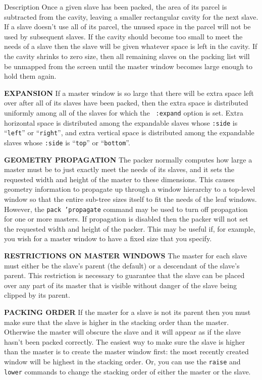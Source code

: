 \begin{schemedoc}{Description}
Once a given slave has been packed, the area of its parcel is subtracted
from the cavity, leaving a smaller rectangular cavity for the next slave.
If a slave doesn't use all of its parcel, the unused space in the parcel
will not be used by subsequent slaves.  If the cavity should become too
small to meet the needs of a slave then the slave will be given whatever
space is left in the cavity.  If the cavity shrinks to zero size, then all
remaining slaves on the packing list will be unmapped from the screen until
the master window becomes large enough to hold them again.

{\bf EXPANSION} If a master window is so large that there will be extra
space left over after all of its slaves have been packed, then the extra
space is distributed uniformly among all of the slaves for which the {\tt
:expand} option is set.  Extra horizontal space is distributed among the
expandable slaves whose {\tt :side} is ``{\tt left}'' or ``{\tt right}'',
and extra vertical space is distributed among the expandable slaves whose
{\tt :side} is ``{\tt top}'' or ``{\tt bottom}''.

{\bf GEOMETRY PROPAGATION} The packer normally computes how large a master
must be to just exactly meet the needs of its slaves, and it sets the
requested width and height of the master to these dimensions.  This causes
geometry information to propagate up through a window hierarchy to a
top-level window so that the entire sub-tree sizes itself to fit the needs
of the leaf windows.  However, the {\tt pack 'propagate} command may be used
to turn off propagation for one or more masters.  If propagation is
disabled then the packer will not set the requested width and height of the
packer.  This may be useful if, for example, you wish for a master window
to have a fixed size that you specify.

{\bf RESTRICTIONS ON MASTER WINDOWS} The master for each slave must either
be the slave's parent (the default) or a descendant of the slave's parent.
This restriction is necessary to guarantee that the slave can be placed
over any part of its master that is visible without danger of the slave
being clipped by its parent.

{\bf PACKING ORDER} If the master for a slave is not its parent then you
must make sure that the slave is higher in the stacking order than the
master.  Otherwise the master will obscure the slave and it will appear as
if the slave hasn't been packed correctly.  The easiest way to make sure
the slave is higher than the master is to create the master window first:
the most recently created window will be highest in the stacking order.
Or, you can use the {\tt raise} and {\tt lower} commands to change the
stacking order of either the master or the slave.
\end{schemedoc}

